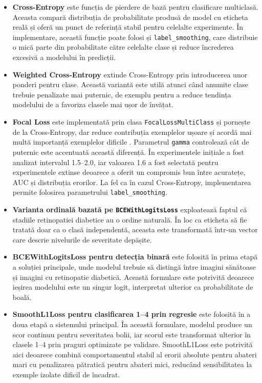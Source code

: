 \documentclass[12pt, a4paper, twoside, romanian]{teza-upb}
\begin{document}
\begin{itemize}
  \item \textbf{Cross-Entropy} este funcția de pierdere de bază pentru clasificare multiclasă.
  Aceasta compară distribuția de probabilitate produsă de model cu eticheta reală și oferă
  un punct de referință stabil pentru celelalte experimente. În implementare, această funcție
  poate folosi și \texttt{label\_smoothing}, care distribuie o mică parte din probabilitate către
  celelalte clase și reduce încrederea excesivă a modelului în predicții.

  \item \textbf{Weighted Cross-Entropy} extinde Cross-Entropy prin introducerea unor ponderi pentru clase.
  Această variantă este utilă atunci când anumite clase trebuie penalizate mai puternic, de
  exemplu pentru a reduce tendința modelului de a favoriza clasele mai ușor de învățat.

  \item \textbf{Focal Loss} este implementată prin clasa \texttt{FocalLossMultiClass} și pornește de la
  Cross-Entropy, dar reduce contribuția exemplelor ușoare și acordă mai multă importanță
  exemplelor dificile \cite{20_lin2017focal}. Parametrul \texttt{gamma} controlează cât de puternic este
  accentuată această diferență. În experimentele inițiale a fost analizat intervalul 1.5--2.0,
  iar valoarea 1.6 a fost selectată pentru experimentele extinse deoarece a oferit un
  compromis bun între acuratețe, AUC și distribuția erorilor. La fel ca în cazul Cross-Entropy,
  implementarea permite folosirea parametrului \texttt{label\_smoothing}.

  \item \textbf{Varianta ordinală bazată pe \texttt{BCEWithLogitsLoss}} exploatează faptul că stadiile
  retinopatiei diabetice au o ordine naturală. În loc ca eticheta să fie tratată doar
  ca o clasă independentă, aceasta este transformată într-un vector care descrie nivelurile
  de severitate depășite.

  \item \textbf{BCEWithLogitsLoss pentru detecția binară} este folosită în prima etapă a soluției
  principale, unde modelul trebuie să distingă între imagini sănătoase și imagini cu retinopatie
  diabetică. Această formulare este potrivită deoarece ieșirea modelului este un singur logit,
  interpretat ulterior ca probabilitate de boală.

  \item \textbf{SmoothL1Loss pentru clasificarea 1--4 prin regresie} este folosită în a doua etapă
  a sistemului principal. În această formulare, modelul produce un scor continuu pentru severitatea
  bolii, iar scorul este transformat ulterior în clasele 1--4 prin praguri optimizate pe validare.
  SmoothL1Loss este potrivită aici deoarece combină comportamentul stabil al erorii absolute pentru
  abateri mari cu penalizarea pătratică pentru abateri mici, reducând sensibilitatea la exemple
  izolate dificil de încadrat.
\end{itemize}
\end{document}
